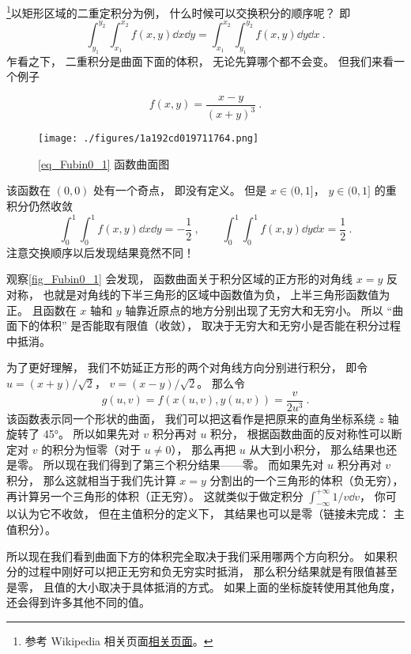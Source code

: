 

\footnote{参考 Wikipedia 相关页面\href{https://en.wikipedia.org/wiki/Fubini's_theorem}{相关页面}。}以矩形区域的二重定积分为例， 什么时候可以交换积分的顺序呢？ 即
\begin{equation}
\int_{y_1}^{y_2}\int_{x_1}^{x_2} f(x, y) \dd{x} \dd{y} = \int_{x_1}^{x_2}\int_{y_1}^{y_2} f(x, y) \dd{y}\dd{x}~.
\end{equation}
乍看之下， 二重积分是曲面下面的体积， 无论先算哪个都不会变。 但我们来看一个例子

\begin{example}{}\label{ex_Fubin0_1}
\begin{equation}\label{eq_Fubin0_1}
f(x, y) = \frac{x - y}{(x+y)^3}~.
\end{equation}
\begin{figure}[ht]
\centering
\texttt{[image: ./figures/1a192cd019711764.png]}
\caption{\autoref{eq_Fubin0_1} 函数曲面图} \label{fig_Fubin0_1}
\end{figure}
该函数在 $(0,0)$ 处有一个奇点， 即没有定义。 但是 $x \in (0, 1]$， $y \in (0, 1]$ 的重积分仍然收敛
\begin{equation}
\int_0^1 \int_0^1 f(x,y) \dd{x} \dd{y} = -\frac{1}{2}~,
\qquad
\int_0^1 \int_0^1 f(x,y) \dd{y} \dd{x} = \frac{1}{2}~.
\end{equation}
注意交换顺序以后发现结果竟然不同！

观察\autoref{fig_Fubin0_1} 会发现， 函数曲面关于积分区域的正方形的对角线 $x=y$ 反对称， 也就是对角线的下半三角形的区域中函数值为负， 上半三角形函数值为正。 且函数在 $x$ 轴和 $y$ 轴靠近原点的地方分别出现了无穷大和无穷小。 所以 “曲面下的体积” 是否能取有限值（收敛）， 取决于无穷大和无穷小是否能在积分过程中抵消。

为了更好理解， 我们不妨延正方形的两个对角线方向分别进行积分， 即令 $u = (x+y)/\sqrt{2}$， $v=(x-y)/\sqrt{2}$。 那么令
\begin{equation}
g(u,v) = f(x(u,v), y(u,v)) = \frac{v}{2u^3}~.
\end{equation}
该函数表示同一个形状的曲面， 我们可以把这看作是把原来的直角坐标系绕 $z$ 轴旋转了 45°。 所以如果先对 $v$ 积分再对 $u$ 积分， 根据函数曲面的反对称性可以断定对 $v$ 的积分为恒零（对于 $u\ne 0$）， 那么再把 $u$ 从大到小积分， 那么结果也还是零。 所以现在我们得到了第三个积分结果——零。 而如果先对 $u$ 积分再对 $v$ 积分， 那么这就相当于我们先计算 $x=y$ 分割出的一个三角形的体积（负无穷）， 再计算另一个三角形的体积（正无穷）。 这就类似于做定积分 $\int_{-\infty}^{+\infty}1/v\dd{v}$， 你可以认为它不收敛， 但在主值积分的定义下， 其结果也可以是零（链接未完成： 主值积分）。

所以现在我们看到曲面下方的体积完全取决于我们采用哪两个方向积分。 如果积分的过程中刚好可以把正无穷和负无穷实时抵消， 那么积分结果就是有限值甚至是零， 且值的大小取决于具体抵消的方式。 如果上面的坐标旋转使用其他角度， 还会得到许多其他不同的值。
\end{example}

